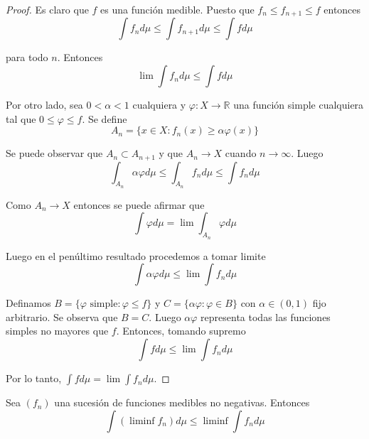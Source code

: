 \begin{proof}
	Es claro que $f$ es una función medible. Puesto que $f_n \leq f_{n+1} \leq f$ entonces
	\begin{equation}
		\int f_n d\mu \leq \int f_{n+1} d\mu \leq \int f d\mu
	\end{equation}
	
	para todo $n$. Entonces
	\begin{equation}
		\lim \int f_n d\mu \leq \int f d\mu
	\end{equation}
	
	Por otro lado, sea $0 < \alpha < 1$ cualquiera y $\varphi: X \rightarrow \mathbb{R}$ una función simple cualquiera tal que $0 \leq \varphi \leq f$. Se define
	\begin{equation}
		A_n = \{ x \in X: f_n(x) \geq \alpha \varphi(x) \}
	\end{equation}
	
	Se puede observar que $A_n \subset A_{n+1}$ y que $A_n \rightarrow X$ cuando $n \rightarrow \infty$. Luego
	\begin{equation}
		\int_{A_n} \alpha \varphi d\mu \leq \int_{A_n} f_n d\mu \leq \int f_n d\mu
	\end{equation}
	
	Como $A_n \rightarrow X$ entonces se puede afirmar que
	\begin{equation}
		\int \varphi d\mu = \lim \int_{A_n} \varphi d\mu
	\end{equation}
	
	Luego en el penúltimo resultado procedemos a tomar limite
	\begin{equation}
		\int \alpha \varphi d\mu \leq \lim \int f_n d\mu
	\end{equation}
	
	Definamos $B=\{\varphi \text{ simple}: \varphi \leq f \}$ y $C = \{ \alpha \varphi: \varphi \in B \}$ con $\alpha \in (0,1)$ fijo arbitrario. Se observa que $B=C$. Luego $\alpha \varphi$ representa todas las funciones simples no mayores que $f$. Entonces, tomando supremo
	\begin{equation}
		\int f d\mu \leq \lim \int f_n d\mu
	\end{equation}	
	
	Por lo tanto, $\int f d\mu = \lim \int f_n d\mu$.
\end{proof}

\begin{teorema}\label{fatou}
	Sea $(f_n)$ una sucesión de funciones medibles no negativas. Entonces
	\begin{equation}
		\int (\liminf f_n) d\mu \leq \liminf \int f_n d\mu
	\end{equation}
\end{teorema}


